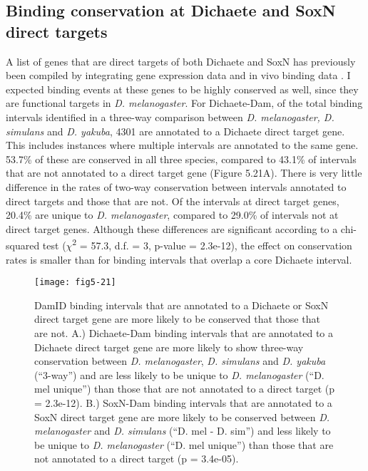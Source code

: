 \subsection{Binding conservation at Dichaete and SoxN direct targets}
A list of genes that are direct targets of both Dichaete and SoxN has previously been compiled by integrating gene expression data and in vivo binding data \citep{aleksic_role_2013,ferrero_soxneuro_2014}. I expected binding events at these genes to be highly conserved as well, since they are functional targets in \emph{D. melanogaster}. For Dichaete-Dam, of the total binding intervals identified in a three-way comparison between \emph{D. melanogaster, D. simulans} and \emph{D. yakuba}, 4301 are annotated to a Dichaete direct target gene. This includes instances where multiple intervals are annotated to the same gene. 53.7\% of these are conserved in all three species, compared to 43.1\% of intervals that are not annotated to a direct target gene (Figure 5.21A). There is very little difference in the rates of two-way conservation between intervals annotated to direct targets and those that are not. Of the intervals at direct target genes, 20.4\% are unique to \emph{D. melanogaster}, compared to 29.0\% of intervals not at direct target genes. Although these differences are significant according to a chi-squared test (\(\chi\)\textsuperscript{2} = 57.3, d.f. = 3, p-value = 2.3e-12), the effect on conservation rates is smaller than for binding intervals that overlap a core Dichaete interval.\\

\begin{figure}
\centering
\texttt{[image: fig5-21]}
\caption{DamID binding intervals that are annotated to a Dichaete or SoxN direct target gene are more likely to be conserved that those that are not. A.) Dichaete-Dam binding intervals that are annotated to a Dichaete direct target gene are more likely to show three-way conservation between \emph{D. melanogaster}, \emph{D. simulans} and \emph{D. yakuba} (“3-way”) and are less likely to be unique to \emph{D. melanogaster} (“D. mel unique”) than those that are not annotated to a direct target (p = 2.3e-12). B.) SoxN-Dam binding intervals that are annotated to a SoxN direct target gene are more likely to be conserved between \emph{D. melanogaster} and \emph{D. simulans} (“D. mel - D. sim”) and less likely to be unique to \emph{D. melanogaster} (“D. mel unique”) than those that are not annotated to a direct target (p = 3.4e-05).}
\label{Figure 5.21}
\end{figure}

